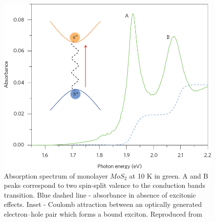 \begin{figure}[!ht]
	\begin{center}
		\includegraphics[scale=0.45]{TMDCAbsorption.png}
		\caption{Absorption spectrum of monolayer $MoS_2$ at 10 K in green. A and B peaks correspond to two spin-split valence to the conduction bands transition. Blue dashed line - absorbance in absence of excitonic effects. Inset - Coulomb attraction between an optically generated electron–hole pair which forms a bound exciton. Reproduced from \cite{Mak2016}}
		\label{fig:TMDCAbsorption}
	\end{center}
\end{figure}

